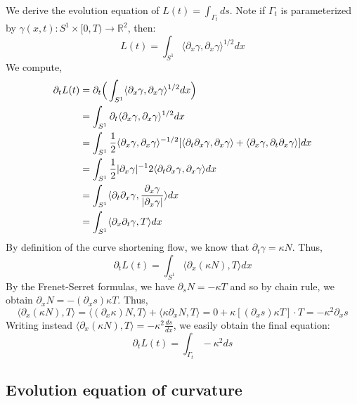 \documentclass{article}
\begin{document}
We derive the evolution equation of  $L(t) = \int_{\Gamma_t} ds$. Note if $\Gamma_t$ is parameterized by $\gamma(x,t): S^1 \times [0,T) \to \mathbb{R}^2$, then:
\[ L(t) = \int_{S^1} \langle \partial_x \gamma, \partial_x \gamma\rangle^{1/2}dx \]
We compute,
\begin{align*}
    \partial_t L(t) &= \partial_t \Big{(} \int_{S^1} \langle \partial_x \gamma, \partial_x \gamma\rangle^{1/2}dx \Big{)} \\
        &= \int_{S^1} \partial_t \langle \partial_x \gamma, \partial_x \gamma\rangle^{1/2}dx \\
        &= \int_{S^1} \frac{1}{2}\langle \partial_x \gamma, \partial_x \gamma\rangle^{-1/2}
            [\langle \partial_t \partial_x \gamma, \partial_x \gamma\rangle + \langle \partial_x \gamma, \partial_t \partial_x \gamma\rangle] dx \\
        &= \int_{S^1} \frac{1}{2}|\partial_x \gamma|^{-1} 2\langle \partial_t \partial_x \gamma, \partial_x \gamma\rangle dx \\
        &= \int_{S^1} \langle \partial_t \partial_x \gamma, \frac{\partial_x \gamma}{|\partial_x \gamma|}\rangle dx \\
        &= \int_{S^1} \langle \partial_x \partial_t \gamma, T\rangle dx
\end{align*}
By definition of the curve shortening flow, we know that $\partial_t \gamma = \kappa N$. Thus,
\[ \partial_t L(t) = \int_{S^1} \langle \partial_x (\kappa N), T\rangle dx \]
By the Frenet-Serret formulas, we have $\partial_s N = -\kappa T$ and so by chain rule, we obtain $\partial_x N = -(\partial_x s)\kappa T$. Thus,
\[ \langle \partial_x (\kappa N), T\rangle = \langle (\partial_x \kappa)N, T\rangle + \langle \kappa \partial_x N, T\rangle = 0 + \kappa [(\partial_x s)\kappa T]\cdot T = -\kappa^2 \partial_x s \]
Writing instead $\langle \partial_x (\kappa N),T\rangle = -\kappa^2 \frac{ds}{dx}$, we easily obtain the final equation:
\[ \partial_t L(t) = \int_{\Gamma_t} -\kappa^2 ds \]

\subsection{Evolution equation of curvature}
\end{document}
